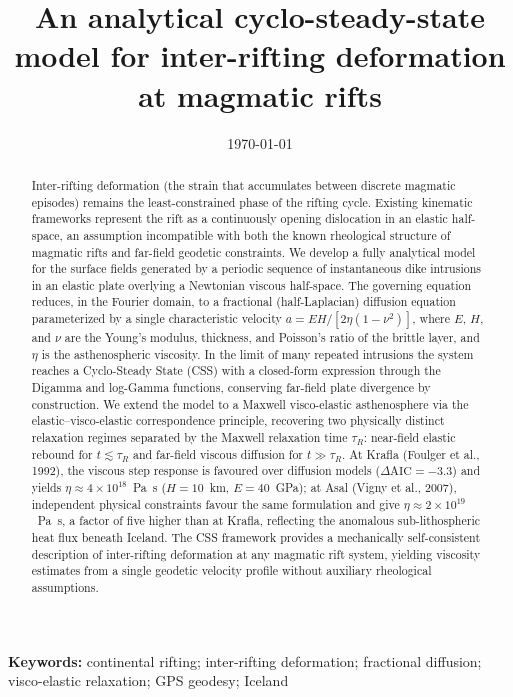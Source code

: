 \documentclass[12pt]{article}
\title{An analytical cyclo-steady-state model for inter-rifting deformation at magmatic rifts}
\date{\today}
\begin{document}
\maketitle

\begin{abstract}
Inter-rifting deformation (the strain that accumulates between discrete
magmatic episodes) remains the least-constrained phase of the rifting
cycle. Existing kinematic frameworks represent the rift as a continuously
opening dislocation in an elastic half-space, an assumption incompatible
with both the known rheological structure of magmatic rifts and far-field
geodetic constraints. We develop a fully analytical model for the surface
fields generated by a periodic sequence of instantaneous dike intrusions
in an elastic plate overlying a Newtonian viscous half-space. The
governing equation reduces, in the Fourier domain, to a fractional
(half-Laplacian) diffusion equation parameterized by a single
characteristic velocity $a = EH/[2\eta(1-\nu^2)]$, where $E$, $H$, and
$\nu$ are the Young's modulus, thickness, and Poisson's ratio of the
brittle layer, and $\eta$ is the asthenospheric viscosity. In the limit of
many repeated intrusions the system reaches a Cyclo-Steady State (CSS)
with a closed-form expression through the Digamma and log-Gamma functions,
conserving far-field plate divergence by construction. We extend the
model to a Maxwell visco-elastic asthenosphere via the
elastic--visco-elastic correspondence principle, recovering two physically
distinct relaxation regimes separated by the Maxwell relaxation time
$\tau_R$: near-field elastic rebound for $t \lesssim \tau_R$ and
far-field viscous diffusion for $t \gg \tau_R$. At Krafla (Foulger et
al., 1992), the viscous step response is favoured over diffusion models
($\Delta\mathrm{AIC} = -3.3$) and yields $\eta \approx 4\times10^{18}$~Pa~s
($H = 10$~km, $E = 40$~GPa); at Asal (Vigny et al., 2007), independent
physical constraints favour the same formulation and give
$\eta \approx 2\times10^{19}$~Pa~s, a factor of five higher than at
Krafla, reflecting the anomalous sub-lithospheric heat flux beneath
Iceland. The CSS framework provides a mechanically self-consistent
description of inter-rifting deformation at any magmatic rift system,
yielding viscosity estimates from a single geodetic velocity profile
without auxiliary rheological assumptions.
\end{abstract}

\textbf{Keywords:} continental rifting; inter-rifting deformation; fractional
diffusion; visco-elastic relaxation; GPS geodesy; Iceland
\end{document}
